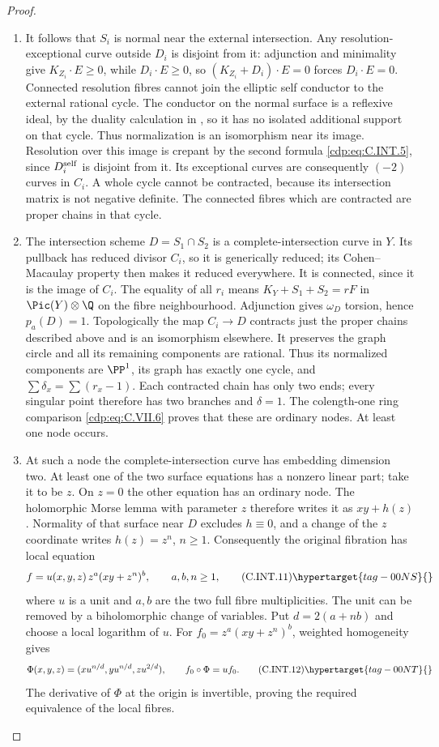\begin{proof}
\begin{enumerate}[label=\arabic*.,leftmargin=*]
\item It follows that $S_i$ is normal near the external
intersection. Any
resolution-exceptional curve outside $D_i$ is
disjoint from it: adjunction and minimality give
$K_{Z_i}\cdot E\ge0$, while $D_i\cdot E\ge0$,
so $(K_{Z_i}+D_i)\cdot E=0$ forces $D_i\cdot E=0$.
Connected resolution fibres cannot join the
elliptic self conductor to the external rational
cycle. The conductor on the normal surface is a
reflexive ideal, by the duality calculation in
, so it has no isolated additional support
on that cycle. Thus normalization is an isomorphism
near its image. Resolution over this image is
crepant by the second formula \eqref{cdp:eq:C.INT.5}, since
$D_i^{\rm self}$ is disjoint from it. Its
exceptional curves are consequently $(-2)$
curves in $C_i$. A whole cycle cannot be contracted,
because its intersection matrix is not negative
definite. The connected fibres which are
contracted are proper chains in that cycle.

\item The intersection scheme $D=S_1\cap S_2$ is a
complete-intersection curve in $Y$. Its pullback
has reduced divisor $C_i$, so it is generically
reduced; its Cohen--Macaulay property then makes
it reduced everywhere. It is connected, since it
is the image of $C_i$. The equality of all $r_i$
means $K_Y+S_1+S_2=rF$ in $\Pic(Y)\otimes\Q$
on the fibre neighbourhood. Adjunction gives
$\omega_D$ torsion, hence $p_a(D)=1$.
Topologically the map $C_i\to D$ contracts just
the proper chains described above and is an
isomorphism elsewhere. It preserves the graph
circle and all its remaining components are
rational. Thus its normalized components are
$\PP^1$, its graph has exactly one cycle, and
$\sum\delta_x=\sum(r_x-1)$. Each contracted
chain has only two ends; every singular point
therefore has two branches and $\delta=1$.
The colength-one ring comparison \eqref{cdp:eq:C.VII.6}
proves that these are ordinary nodes. At least
one node occurs.

\item At such a node the complete-intersection curve
has embedding dimension two. At least one of
the two surface equations has a nonzero linear
part; take it to be $z$. On $z=0$ the other
equation has an ordinary node. The holomorphic
Morse lemma with parameter $z$ therefore writes
it as $xy+h(z)$. Normality of that surface near
$D$ excludes $h\equiv0$, and a change of the
$z$ coordinate writes $h(z)=z^n$, $n\ge1$.
Consequently the original fibration has local
equation
\[
 f=u(x,y,z)\,z^a(xy+z^n)^b,
 \qquad a,b,n\ge1,
 \tag{C.INT.11}\hypertarget{tag-00NS}{}\label{cdp:eq:C.INT.11}
\]
where $u$ is a unit and $a,b$ are the two full
fibre multiplicities. The unit can be removed
by a biholomorphic change of variables.
Put $d=2(a+nb)$ and choose a local logarithm of
$u$. For $f_0=z^a(xy+z^n)^b$, weighted homogeneity
gives
\[
 \Phi(x,y,z)=(x u^{n/d},y u^{n/d},z u^{2/d}),
 \qquad f_0\circ\Phi=u f_0.
 \tag{C.INT.12}\hypertarget{tag-00NT}{}\label{cdp:eq:C.INT.12}
\]
The derivative of $\Phi$ at the origin is
invertible, proving the required equivalence
of the local fibres.


\end{enumerate}
\end{proof}
